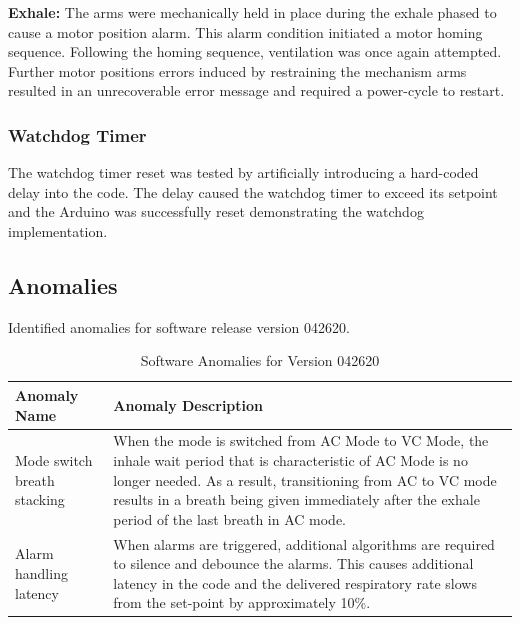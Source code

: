 \documentclass[]{article}
\begin{document}
\noindent \textbf{Exhale:} The arms were mechanically held in place during the exhale phased to cause a motor position alarm.  This alarm condition initiated a motor homing sequence. Following the homing sequence, ventilation was once again attempted.  Further motor positions errors induced by restraining the mechanism arms resulted in an unrecoverable error message and required a power-cycle to restart.

\subsubsection{Watchdog Timer}
The watchdog timer reset was tested by artificially introducing a hard-coded delay into the code.  The delay caused the watchdog timer to exceed its setpoint and the Arduino was successfully reset demonstrating the watchdog implementation.

\subsection{Anomalies}
\label{sect:anomalies}

Identified anomalies for software release version 042620.

\begin{center}
	\begin{table}[h]
		\caption{Software Anomalies for Version 042620}
		\label{tab:sw_anom}
		\begin{tabular}{ |p{4cm}|p{10cm}|}
			
			\hline
			\textbf{Anomaly Name} & \textbf{Anomaly Description}  \\ \hline
			Mode switch breath stacking & When the mode is switched from AC Mode to VC Mode, the inhale wait period that is characteristic of AC Mode is no longer needed.  As a result, transitioning from AC to VC mode results in a breath being given immediately after the exhale period of the last breath in AC mode.\\ \hline 
			Alarm handling latency & When alarms are triggered, additional algorithms are required to silence and debounce the alarms.  This causes additional latency in the code and the delivered respiratory rate slows from the set-point by approximately 10\%.\\ \hline
		
			
		\end{tabular}
	\end{table}	
\end{center}
\end{document}
